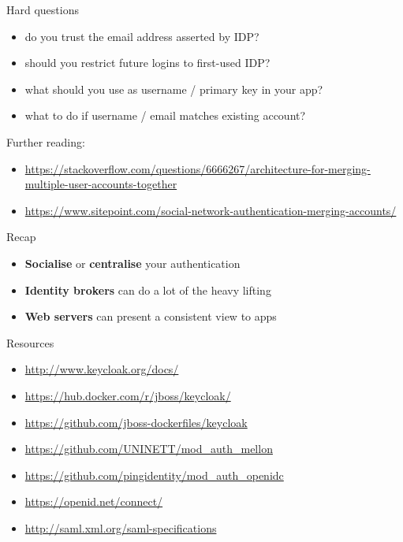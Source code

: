 \documentclass[ignorenonframetext,aspectratio=169]{beamer}
\providecommand{\tightlist}{%
  \setlength{\itemsep}{0pt}\setlength{\parskip}{0pt}}
\begin{document}
\begin{frame}{Hard questions}

\begin{itemize}
\tightlist
\item
  do you trust the email address asserted by IDP?
\item
  should you restrict future logins to first-used IDP?
\item
  what should you use as username / primary key in your app?
\item
  what to do if username / email matches existing account?
\end{itemize}

Further reading:

\begin{itemize}
\tightlist
\item \url{https://stackoverflow.com/questions/6666267/architecture-for-merging-multiple-user-accounts-together}
\item \url{https://www.sitepoint.com/social-network-authentication-merging-accounts/}
\end{itemize}


\end{frame}

\begin{frame}{Recap}

\begin{itemize}
\tightlist
\item {\bf Socialise} or {\bf centralise} your authentication
\item \textbf{Identity brokers} can do a lot of the heavy lifting
\item \textbf{Web servers} can present a consistent view to apps
\end{itemize}

\end{frame}

\begin{frame}{Resources}

\begin{itemize}
\tightlist
\item \url{http://www.keycloak.org/docs/}
\item \url{https://hub.docker.com/r/jboss/keycloak/}
\item \url{https://github.com/jboss-dockerfiles/keycloak}
\item \url{https://github.com/UNINETT/mod_auth_mellon}
\item \url{https://github.com/pingidentity/mod_auth_openidc}
\item \url{https://openid.net/connect/}
\item \url{http://saml.xml.org/saml-specifications}
\end{itemize}

\end{frame}
\end{document}
